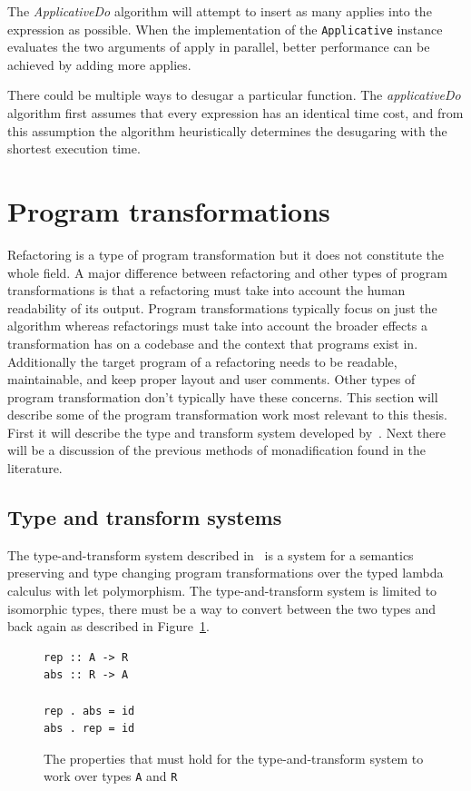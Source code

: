 The \textit{ApplicativeDo} algorithm will attempt to insert as many applies into the expression as possible. When the implementation of the \texttt{Applicative} instance evaluates the two arguments of apply in parallel, better performance can be achieved by adding more applies. 

There could be multiple ways to desugar a particular function. The \textit{applicativeDo} algorithm first assumes that every expression has an identical time cost, and from this assumption the algorithm heuristically determines the desugaring with the shortest execution time.


\section{Program transformations}\label{typeTrans}

Refactoring is a type of program transformation but it does not constitute the whole field. A major difference between refactoring and other types of program transformations is that a refactoring must take into account the human readability of its output. Program transformations typically focus on just the algorithm whereas refactorings must take into account the broader effects a transformation has on a codebase and the context that programs exist in. Additionally the target program of a refactoring needs to be readable, maintainable, and keep proper layout and user comments. Other types of program transformation don't typically have these concerns. This section will describe some of the program transformation work most relevant to this thesis. First it will describe the type and transform system developed by~\citep{typeAndTransformSemantics}. Next there will be a discussion of the previous methods of monadification found in the literature. 

\subsection{Type and transform systems}

The type-and-transform system described in~\citep{typeAndTransformSemantics} is a system for a semantics preserving and type changing program transformations over the typed lambda calculus with let polymorphism. The type-and-transform system is limited to isomorphic types, there must be a way to convert between the two types and back again as described in Figure~\ref{transformIso}.

\begin{figure}[t]
\begin{lstlisting}
rep :: A -> R
abs :: R -> A

rep . abs = id
abs . rep = id
\end{lstlisting}
\caption{The properties that must hold for the type-and-transform system to work over types \texttt{A} and \texttt{R}}
\label{transformIso}
\end{figure} 

